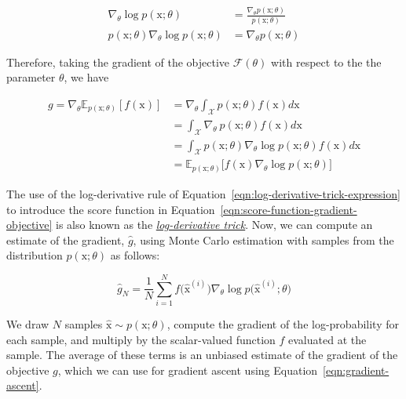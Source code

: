 \begin{equation}\label{eqn:log-derivative-trick-expression}
    \begin{split}
        \nabla_\theta\log p(\mathrm{x};\theta) &= \frac{\nabla_{\theta}p(\mathrm{x}; \theta)}{p(\mathrm{x};\theta)} \\
        p(\mathrm{x};\theta) \nabla_{\theta}\log p(\mathrm{x};\theta) &= \nabla_{\theta}p(\mathrm{x};\theta)
    \end{split}
\end{equation}

\noindent Therefore, taking the gradient of the objective $\mathcal{F}(\theta)$ with respect to the the parameter $\theta$, we have

\begin{equation}\label{eqn:score-function-gradient-objective}
    \begin{split}
        g = \nabla_{\theta} \mathbb{E}_{p(\mathrm{x};\theta)}[f(\mathrm{x})] &= \nabla_{\theta}\int_{\mathcal{X}} p(\mathrm{x};\theta) f(\mathrm{x}) d\mathrm{x} \\
        &= \int_\mathcal{X} \nabla_{\theta}~p(\mathrm{x}; \theta)f(\mathrm{x})d\mathrm{x} \\
        &= \int_{\mathcal{X}}p(\mathrm{x};\theta)\nabla_{\theta}\log p(\mathrm{x}; \theta) f(\mathrm{x})d\mathrm{x} \\
        &=\mathbb{E}_{p(\mathrm{x};\theta)}\big[f(\mathrm{x})\nabla_{\theta}\log p(\mathrm{x};\theta) \big] 
    \end{split}
\end{equation}

\noindent The use of the log-derivative rule of Equation~\ref{eqn:log-derivative-trick-expression} to introduce the score function in Equation~\ref{eqn:score-function-gradient-objective} is also known as the \href{https://blog.shakirm.com/2015/11/machine-learning-trick-of-the-day-5-log-derivative-trick/}{\textit{log-derivative trick}}. Now, we can compute an estimate of the gradient, $\hat{g}$, using Monte Carlo estimation with samples from the distribution $p(\mathrm{x};\theta)$ as follows:

\begin{equation}\label{eqn:score-function-gradient-estimator}
    \hat{g}_{N} = \frac{1}{N}\sum_{i=1}^{N}f\big(\hat{\mathrm{x}}^{(i)}\big) \nabla_{\theta}\log p\big(\hat{\mathrm{x}}^{(i)};\theta\big)
\end{equation}

\noindent We draw $N$ samples $\hat{\mathrm{x}}\sim p(\mathrm{x};\theta)$, compute the gradient of the log-probability for each sample, and multiply by the scalar-valued function $f$ evaluated at the sample. The average of these terms is an unbiased estimate of the gradient of the objective $g$, which we can use for gradient ascent using Equation~\ref{eqn:gradient-ascent}.

